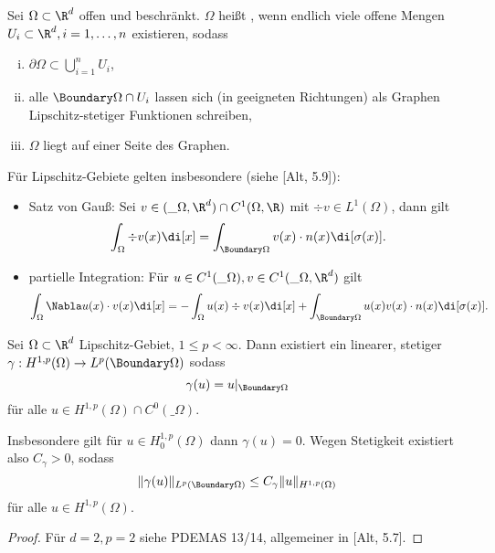 
\begin{df}
	Sei $\Omega \subset \R^d$ offen und beschränkt.
	$\Omega$ heißt , wenn endlich viele offene Mengen $U_i \subset \R^d, i = 1, \dotsc, n$ existieren, sodass
	\begin{enumerate}[i)]
		\item
			$\partial \Omega \subset \bigcup_{i=1}^n U_i$,
		\item
			alle $\Boundary \Omega \cap U_i$ lassen sich (in geeigneten Richtungen) als Graphen Lipschitz-stetiger Funktionen schreiben,
		\item
			$\Omega$ liegt auf einer Seite des Graphen.
	\end{enumerate}
	\begin{note}
		Für Lipschitz-Gebiete gelten insbesondere (siehe [Alt, 5.9]):
		\begin{itemize}
			\item
				Satz von Gauß:
				Sei $v \in (\_\Omega, \R^d) \cap C^1(\Omega, \R)$ mit $\div v \in L^1(\Omega)$, dann gilt
				\[
					\int_\Omega \div v(x) \di[x]
					= \int_{\Boundary \Omega} v(x) \cdot n(x) \di[\sigma(x)].
				\]
			\item
				partielle Integration:
				Für $u \in C^1(\_\Omega), v \in C^1(\_\Omega, \R^d)$ gilt
				\[
					\int_\Omega \Nabla u(x) \cdot v(x) \di[x]
					= - \int_\Omega u(x) \div v(x) \di[x] + \int_{\Boundary \Omega} u(x) v(x) \cdot n(x) \di[\sigma(x)].
				\]
		\end{itemize}
	\end{note}
\end{df}

\begin{st}[Spursatz] \label{3.10}
	Sei $\Omega \subset \R^d$ Lipschitz-Gebiet, $1 \le p < \infty$.
	Dann existiert ein linearer, stetiger  $\gamma: H^{1,p}(\Omega) \to L^p(\Boundary \Omega)$ sodass
	\[
		\gamma(u) = u|_{\Boundary \Omega}
	\]
	für alle $u \in H^{1,p}(\Omega) \cap C^0(\_\Omega)$.

	Insbesondere gilt für $u \in H_0^{1,p}(\Omega)$ dann $\gamma(u) = 0$.
	Wegen Stetigkeit existiert also $C_\gamma > 0$, sodass
	\[
		\|\gamma(u)\|_{L^p(\Boundary \Omega)} \le C_\gamma \|u\|_{H^{1,p}(\Omega)}
	\]
	für alle $u \in H^{1,p}(\Omega)$.
	\begin{proof}
		Für $d = 2, p = 2$ siehe PDEMAS 13/14, allgemeiner in [Alt, 5.7].
	\end{proof}
\end{st}

